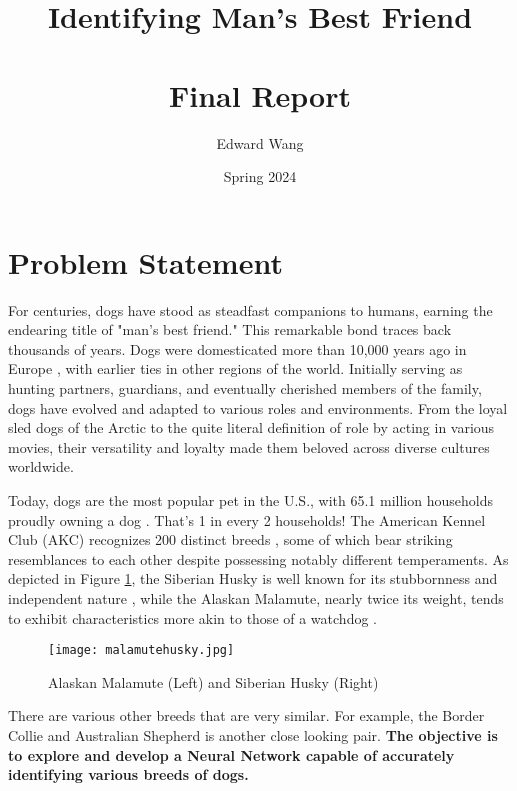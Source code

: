 \documentclass[11pt]{article}
\title{%
  Identifying Man's Best Friend \\
  \; \\
  \large Final Report}
\author{Edward Wang}
\date{Spring 2024}
\begin{document}
\begin{titlingpage}
\maketitle
\end{titlingpage}

\newpage

\tableofcontents

\newpage

\section{Problem Statement}

For centuries, dogs have stood as steadfast companions to humans, earning the endearing title of "man's best friend." This remarkable bond traces back thousands of years. Dogs were domesticated more than 10,000 years ago in Europe \cite{dog1}, with earlier ties in other regions of the world. Initially serving as hunting partners, guardians, and eventually cherished members of the family, dogs have evolved and adapted to various roles and environments. From the loyal sled dogs of the Arctic to the quite literal definition of role by acting in various movies, their versatility and loyalty made them beloved across diverse cultures worldwide. 

Today, dogs are the most popular pet in the U.S., with 65.1 million households  proudly owning a dog \cite{forbes}. That's 1 in every 2 households! The American Kennel Club (AKC) recognizes 200 distinct breeds \cite{akc}, some of which bear striking resemblances to each other despite possessing notably different temperaments. As depicted in Figure \ref{fig:husky}, the Siberian Husky is well known for its stubbornness and independent nature     \cite{akc_husky}, while the Alaskan Malamute, nearly twice its weight, tends to exhibit characteristics more akin to those of a watchdog \cite{akc_mal}. 

\begin{figure}[h]
\centering
\texttt{[image: malamutehusky.jpg]}
\caption{\label{fig:husky}Alaskan Malamute (Left) and Siberian Husky (Right)}
\end{figure}

There are various other breeds that are very similar. For example, the Border Collie and Australian Shepherd is another close looking pair. \textbf{The objective is to explore and develop a Neural Network capable of accurately identifying various breeds of dogs.}
\end{document}
